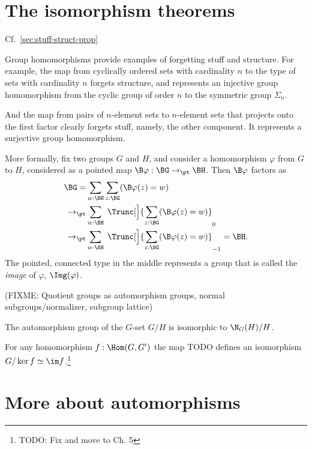 \section{The isomorphism theorems}
\label{sec:noether-theorems}

Cf.~\cref{sec:stuff-struct-prop}

Group homomorphisms provide examples of forgetting stuff and structure.
For example, the map from cyclically ordered sets with cardinality $n$
to the type of sets with cardinality $n$ forgets structure,
and represents an injective group homomorphism from the cyclic
group of order $n$ to the symmetric group $\Sigma_n$.

And the map from pairs of $n$-element sets to $n$-element sets
that projects onto the first factor clearly forgets stuff,
namely, the other component.
It represents a surjective group homomorphism.

More formally, fix two groups $G$ and $H$,
and consider a homomorphism $\varphi$ from $G$ to $H$,
considered as a pointed map $\B\varphi : \BG \to_\pt \BH$.
Then $\B\varphi$ factors as
\begin{align*}
  \BG
  = &\sum_{w:\BH}\sum_{z:\BG}(\B\varphi(z)=w)\\
  \to_\pt &\sum_{w:\BH}\;\Trunc[\Big]{\sum_{z:\BG}(\B\varphi(z)=w)}_0\\
  \to_\pt &\sum_{w:\BH}\;\Trunc[\Big]{\sum_{z:\BG}(\B\varphi(z)=w)}_{-1} = \BH.
\end{align*}
The pointed, connected type in the middle represents a group
that is called the \emph{image} of $\varphi$, $\Img(\varphi)$.


(FIXME: Quotient groups as automorphism groups, normal subgroups/normalizer, subgroup lattice)

\begin{lemma}
  \label{lem:aut-orbit}
  The automorphism group of the $G$-set $G/H$ is isomorphic to $\N_G(H)/H$.
\end{lemma}

\begin{theorem}
  \label{thm:fund-thm-homs}
  For any homomorphism $f : \Hom(G,G')$
  the map {\color{blue} TODO} defines an isomorphism
  $G/\ker f \simeq \im f$.\footnote{TODO: Fix and move to Ch. 5}
\end{theorem}

\section{More about automorphisms}
\label{sec:automorphisms}


